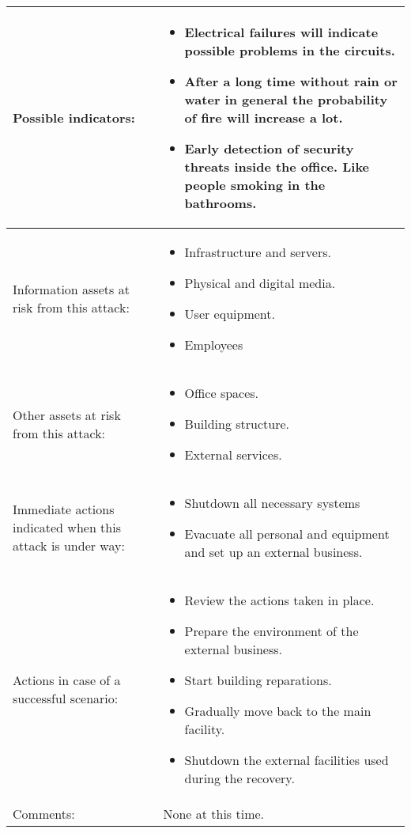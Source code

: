 \begin{longtable}{| p{4cm} | p{8cm} |}
	Possible indicators: &
	\begin{itemize}
	\item Electrical failures will indicate possible problems in the circuits.
	\item After a long time without rain or water in general the probability of fire will increase a lot.
	\item Early detection of security threats inside the office. Like people smoking in the bathrooms.
	\end{itemize}\\\hline
	
	Information assets at risk from this attack: &
	\begin{itemize}
	\item Infrastructure and servers.
	\item Physical and digital media.
	\item User equipment.
	\item Employees
	\end{itemize}\\\hline
	
	Other assets at risk from this attack: &
	\begin{itemize}
	\item Office spaces.
	\item Building structure.
	\item External services.
	\end{itemize}\\\hline

	Immediate actions indicated when this attack is under way: &
	\begin{itemize}
	\item Shutdown all necessary systems
	\item Evacuate all personal and equipment and set up an external business.
	\end{itemize}\\\hline
	
	Actions in case of a successful scenario: &
	\begin{itemize}
	\item Review the actions taken in place.
	\item Prepare the environment of the external business.
	\item Start building reparations.
	\item Gradually move back to the main facility.
	\item Shutdown the external facilities used during the recovery.
	\end{itemize}\\\hline
	
	Comments: & None at this time. \\\hline

\end{longtable}

